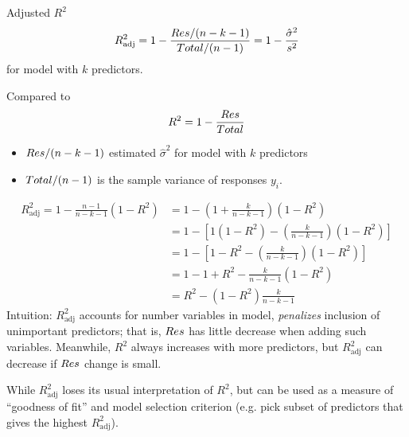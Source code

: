 \begin{Definition}{Adjusted $ R^2 $}{}
      \[ R^2_{\text{adj}}=1-\frac{\relax{Res}/(n-k-1)}{
                  \relax{Total}/(n-1)
            }=1-\frac{\hat{\sigma}^2}{s^2}  \]
      for model with $ k $ predictors.
\end{Definition}
Compared to
\[ R^2=1-\frac{\relax{Res}}{\relax{Total}}  \]
\begin{itemize}
      \item $ \relax{Res}/(n-k-1) $
            estimated $ \hat{\sigma}^2 $
            for model with $ k $ predictors
      \item $ \relax{Total}/(n-1) $ is the sample variance
            of responses $ y_i $.
\end{itemize}
\begin{align*}
      R^2_{\text{adj}}=1-\frac{n-1}{n-k-1}(1-R^2)
       & = 1-\left( 1+\frac{k}{n-k-1} \right)
      (1-R^2)                                                             \\
       & =1-\left[ 1(1-R^2)-\left( \frac{k}{n-k-1} \right)(1-R^2) \right] \\
       & =1-\left[ 1-R^2-\left( \frac{k}{n-k-1}  \right)(1-R^2) \right]   \\
       & =1-1+R^2-\frac{k}{n-k-1} (1-R^2)                                 \\
       & =R^2-(1-R^2)\frac{k}{n-k-1}
\end{align*}
Intuition: $ R^2_{\text{adj}} $
accounts for number variables in model,
\emph{penalizes} inclusion of unimportant
predictors; that is, $ \relax{Res} $
has little decrease when adding
such variables. Meanwhile, $ R^2 $
always increases with more predictors,
but $ R^2_{\text{adj}} $ can decrease
if $ \relax{Res} $ change is small.

While $ R^2_{\text{adj}} $ loses its usual
interpretation of $ R^2 $, but can be used
as a measure of ``goodness of fit''
and model selection criterion (e.g.
pick subset of predictors that gives the highest
$ R^2_{\text{adj}} $).


